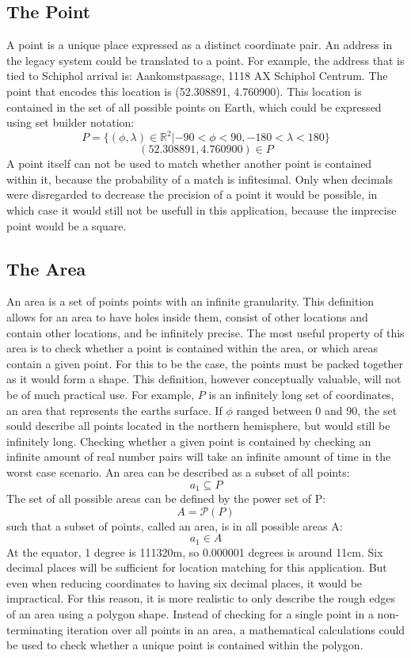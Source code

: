 \subsection{The Point}
A point is a unique place expressed as a distinct coordinate pair. An address in the legacy system could be translated to a point. For example, the address that is tied to Schiphol arrival is: Aankomstpassage, 1118 AX Schiphol Centrum.
The point that encodes this location is (52.308891, 4.760900). This location is contained in the set of all possible points on Earth, which could be expressed using set builder notation:
\[P = \{(\phi,\lambda) \in \mathbb{R}^2 | -90 < \phi < 90, -180 < \lambda < 180 \}\]
\[(52.308891, 4.760900) \in P\]
A point itself can not be used to match whether another point is contained within it, because the probability of a match is infitesimal. Only when decimals were disregarded to decrease the precision of a point it would be possible, in which case it would still not be usefull in this application, because the imprecise point would be a square.

\subsection{The Area}
An area is a set of points points with an infinite granularity. This definition allows for an area to have holes inside them, consist of other locations and contain other locations, and be infinitely precise. The most useful property of this area is to check whether a point is contained within the area, or which areas contain a given point. For this to be the case, the points must be packed together as it would form a shape. This definition, however conceptually valuable, will not be of much practical use. For example, $P$ is an infinitely long set of coordinates, an area that represents the earths surface. If $\phi$ ranged between 0 and 90, the set sould describe all points located in the northern hemisphere, but would still be infinitely long. Checking whether a given point is contained by checking an infinite amount of real number pairs will take an infinite amount of time in the worst case scenario. An area can be described as a subset of all points:
\[a_1 \subseteq P \]
The set of all possible areas can be defined by the power set of P:
\[A = \mathcal{P}(P)\]
such that a subset of points, called an area, is in all possible areas A:
\[a_1 \in A\]
At the equator, 1 degree is 111320m, so 0.000001 degrees is
around 11cm. Six decimal places will be sufficient for location matching for this application. But even when reducing coordinates to having six decimal places, it would be impractical. For this reason, it is more realistic to only describe the rough edges of an area using a polygon shape. Instead of checking for a single point in a non-terminating iteration over all points in an area, a mathematical calculations could be used to check whether a unique point is contained within the polygon.

